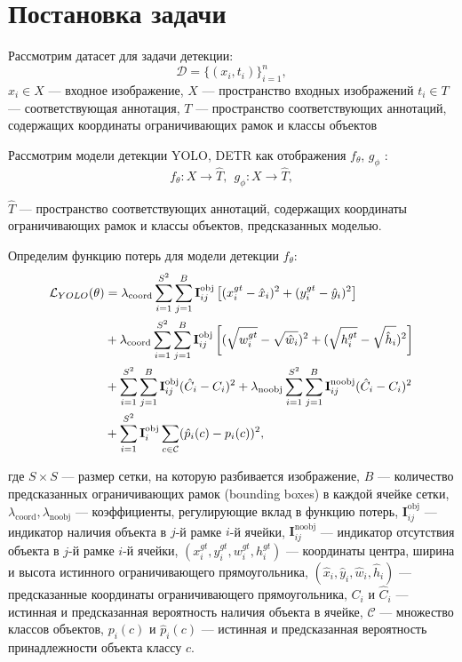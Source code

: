 \section{Постановка задачи}
\label{sec1}
Рассмотрим датасет для задачи детекции:
\[
\mathcal{D} = \bigl\{(x_i, t_i)\bigr\}_{i=1}^n,
\]
$x_i \in X$ — входное изображение, $X$ — пространство входных изображений
$t_i \in T$ — соответствующая аннотация, $T$ — пространство соответствующих аннотаций, содержащих координаты ограничивающих рамок и классы объектов

Рассмотрим модели детекции YOLO\cite{DBLP:journals/corr/RedmonDGF15}, DETR\cite{DBLP:journals/corr/abs-2005-12872} как отображения $f_{\theta}$,  $g_{\phi}$ :
\[
f_{\theta}: X \to \hat{T}, \  \ g_{\phi}: X \to \hat{T},
\]

$\hat{T}$ — пространство соответствующих аннотаций, содержащих координаты ограничивающих рамок и классы объектов, предсказанных моделью.

Определим функцию потерь для модели детекции $f_{\theta}$:
\begin{align*}
\mathcal{L}_{YOLO}(\theta) &= \lambda_{\text{coord}} \sum_{i=1}^{S^2} \sum_{j=1}^{B} \textbf{I}_{ij}^{\text{obj}} 
\left[ (x^{gt}_i - \hat{x}_i)^2 + (y^{gt}_i - \hat{y}_i)^2 \right] \notag \\
&+ \lambda_{\text{coord}} \sum_{i=1}^{S^2} \sum_{j=1}^{B} \textbf{I}_{ij}^{\text{obj}} 
\left[ (\sqrt{w^{gt}_i} - \sqrt{\hat{w}_i})^2 + (\sqrt{h^{gt}_i} - \sqrt{\hat{h}_i})^2 \right] \notag \\
&+ \sum_{i=1}^{S^2} \sum_{j=1}^{B} \textbf{I}_{ij}^{\text{obj}} (\hat{C}_i - C_i)^2 
+ \lambda_{\text{noobj}} \sum_{i=1}^{S^2} \sum_{j=1}^{B} \textbf{I}_{ij}^{\text{noobj}} (\hat{C}_i - C_i)^2 \notag \\
&+ \sum_{i=1}^{S^2} \textbf{I}_{i}^{\text{obj}} \sum_{c \in \mathcal{C}} (\hat{p}_i(c) - p_i(c))^2,
\end{align*}

где 
$S \times S$ — размер сетки, на которую разбивается изображение, $B$ — количество предсказанных ограничивающих рамок (bounding boxes) в каждой ячейке сетки,  
$\lambda_{\text{coord}}, \lambda_{\text{noobj}}$ — коэффициенты, регулирующие вклад  в функцию потерь,
$\textbf{I}_{ij}^{\text{obj}}$ — индикатор наличия объекта в $j$-й рамке $i$-й ячейки,  
$\textbf{I}_{ij}^{\text{noobj}}$ — индикатор отсутствия объекта в $j$-й рамке $i$-й ячейки,  
$(x^{gt}_i, y^{gt}_i, w^{gt}_i, h^{gt}_i)$ — координаты центра, ширина и высота истинного ограничивающего прямоугольника,  
$(\hat{x}_i, \hat{y}_i, \hat{w}_i, \hat{h}_i)$ — предсказанные координаты ограничивающего прямоугольника,  
$C_i$ и $\hat{C}_i$ — истинная и предсказанная вероятность наличия объекта в ячейке,  \(\mathcal{C}\) — множество классов объектов,
$p_i(c)$ и $\hat{p}_i(c)$ — истинная и предсказанная вероятность принадлежности объекта классу $c$.

